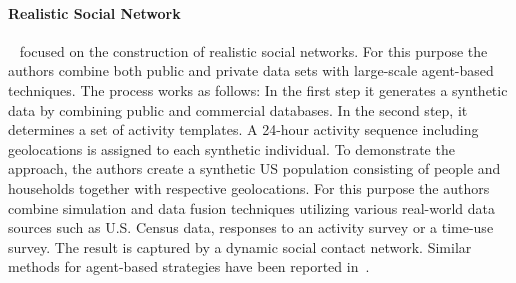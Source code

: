 
\paragraph{Realistic Social Network}
~\cite{Barrett:2009:GAL:1995456.1995598} focused on the construction of
realistic social networks. For this purpose the authors combine both public and
private data sets with large-scale agent-based techniques. The process works as
follows: In the first step it generates a synthetic data by combining public and
commercial databases. In the second step, it determines a set of activity
templates. A 24-hour activity sequence including geolocations is assigned to
each synthetic individual. To demonstrate the approach, the authors create a
synthetic US population consisting of people and households together with
respective geolocations. For this purpose the authors combine simulation and
data fusion techniques utilizing various real-world data sources such as U.S.
Census data, responses to an activity survey or a time-use survey.
The result is captured by a dynamic social contact network. Similar methods for
agent-based strategies have been reported
in~\cite{Bernstein:2013:SAS:2499604.2499609}.


